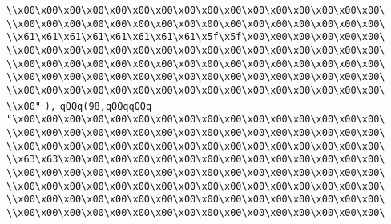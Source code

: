 \verb|\\x00\x00\x00\x00\x00\x00\x00\x00\x00\x00\x00\x00\x00\x00\x00\x00\|\newline
\verb|\\x00\x00\x00\x00\x00\x00\x00\x00\x00\x00\x00\x00\x00\x00\x00\x00\|\newline
\verb|\\x61\x61\x61\x61\x61\x61\x61\x61\x5f\x5f\x00\x00\x00\x00\x00\x00\|\newline
\verb|\\x00\x00\x00\x00\x00\x00\x00\x00\x00\x00\x00\x00\x00\x00\x00\x00\|\newline
\verb|\\x00\x00\x00\x00\x00\x00\x00\x00\x00\x00\x00\x00\x00\x00\x00\x00\|\newline
\verb|\\x00\x00\x00\x00\x00\x00\x00\x00\x00\x00\x00\x00\x00\x00\x00\x00\|\newline
\verb|\\x00\x00\x00\x00\x00\x00\x00\x00\x00\x00\x00\x00\x00\x00\x00\x00\|\newline
\verb|\\x00"|\newline
\verb|),|\newline
\verb|qQQq(98,qQQqqQQq|\newline
\verb|"\x00\x00\x00\x00\x00\x00\x00\x00\x00\x00\x00\x00\x00\x00\x00\x00\|\newline
\verb|\\x00\x00\x00\x00\x00\x00\x00\x00\x00\x00\x00\x00\x00\x00\x00\x00\|\newline
\verb|\\x00\x00\x00\x00\x00\x00\x00\x00\x00\x00\x00\x00\x00\x00\x00\x00\|\newline
\verb|\\x63\x63\x00\x00\x00\x00\x00\x00\x00\x00\x00\x00\x00\x00\x00\x00\|\newline
\verb|\\x00\x00\x00\x00\x00\x00\x00\x00\x00\x00\x00\x00\x00\x00\x00\x00\|\newline
\verb|\\x00\x00\x00\x00\x00\x00\x00\x00\x00\x00\x00\x00\x00\x00\x00\x00\|\newline
\verb|\\x00\x00\x00\x00\x00\x00\x00\x00\x00\x00\x00\x00\x00\x00\x00\x00\|\newline
\verb|\\x00\x00\x00\x00\x00\x00\x00\x00\x00\x00\x00\x00\x00\x00\x00\x00\|\newline
